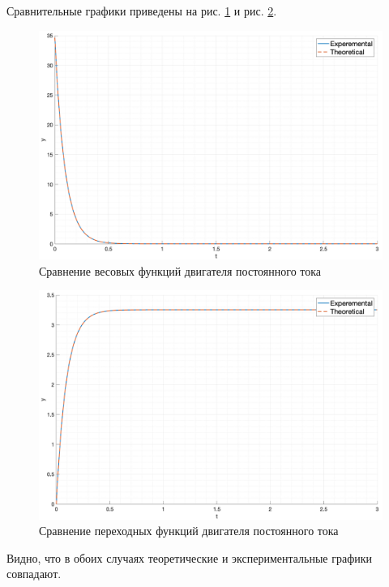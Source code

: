 Сравнительные графики приведены на рис. \ref{fig:task1_impulse_response_cmp} и рис. \ref{fig:task1_step_response_cmp}.
\begin{figure}[ht!]
    \centering
    \includegraphics[width=\textwidth]{media/plots/task1_impulse_response_cmp.png}
    \caption{Сравнение весовых функций двигателя постоянного тока}
    \label{fig:task1_impulse_response_cmp}
\end{figure}
\begin{figure}[ht!]
    \centering
    \includegraphics[width=\textwidth]{media/plots/task1_step_response_cmp.png}
    \caption{Сравнение переходных функций двигателя постоянного тока}
    \label{fig:task1_step_response_cmp}
\end{figure}

Видно, что в обоих случаях теоретические и экспериментальные графики совпадают.

\FloatBarrier
